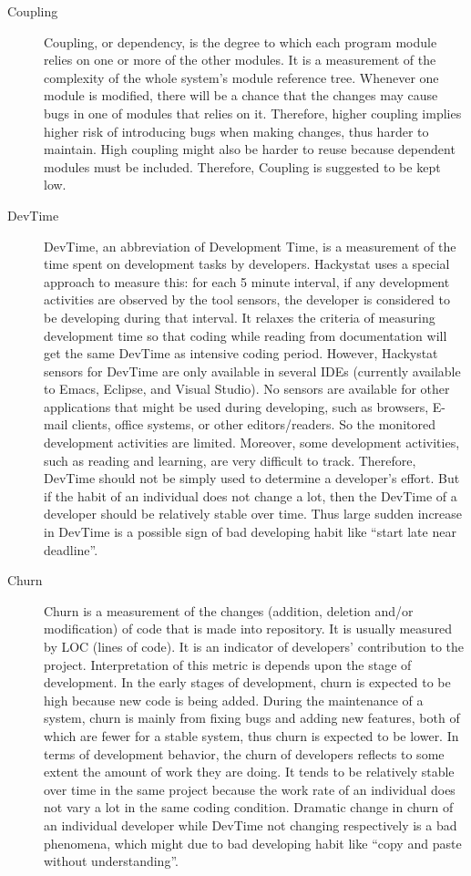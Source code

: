 \begin{description}
\item[Coupling] 
Coupling, or dependency, is the degree to which each program module relies on one or more of the other modules. It is a measurement of the complexity of the whole system's module reference tree. Whenever one module is modified, there will be a chance that the changes may cause bugs in one of modules that relies on it. Therefore, higher coupling implies higher risk of introducing bugs when making changes, thus harder to maintain. High coupling might also be harder to reuse because dependent modules must be included. Therefore, Coupling is suggested to be kept low.

\item[DevTime] 
DevTime, an abbreviation of Development Time, is a measurement of the time spent on development tasks by developers. Hackystat uses a special approach to measure this: for each 5 minute interval, if any development activities are observed by the tool sensors, the developer is considered to be developing during that interval. It relaxes the criteria of measuring development time so that coding while reading from documentation will get the same DevTime as intensive coding period. However, Hackystat sensors for DevTime are only available in several IDEs (currently available to Emacs, Eclipse, and Visual Studio). No sensors are available for other applications that might be used during developing, such as browsers, E-mail clients, office systems, or other editors/readers. So the monitored development activities are limited. Moreover, some development activities, such as reading and learning, are very difficult to track. Therefore, DevTime should not be simply used to determine a developer's effort. But if the habit of an individual does not change a lot, then the DevTime of a developer should be relatively stable over time. Thus large sudden increase in DevTime is a possible sign of bad developing habit like ``start late near deadline''.

\item[Churn] 
Churn is a measurement of the changes (addition, deletion and/or modification) of code that is made into repository. It is usually measured by LOC (lines of code). It is an indicator of developers' contribution to the project. Interpretation of this metric is depends upon the stage of development. In the early stages of development, churn is expected to be high because new code is being added. During the maintenance of a system, churn is mainly from fixing bugs and adding new features, both of which are fewer for a stable system, thus churn is expected to be lower. In terms of development behavior, the churn of developers reflects to some extent the amount of work they are doing. It tends to be relatively stable over time in the same project because the work rate of an individual does not vary a lot in the same coding condition. Dramatic change in churn of an individual developer while DevTime not changing respectively is a bad phenomena, which might due to bad developing habit like ``copy and paste without understanding''.


\end{description}
